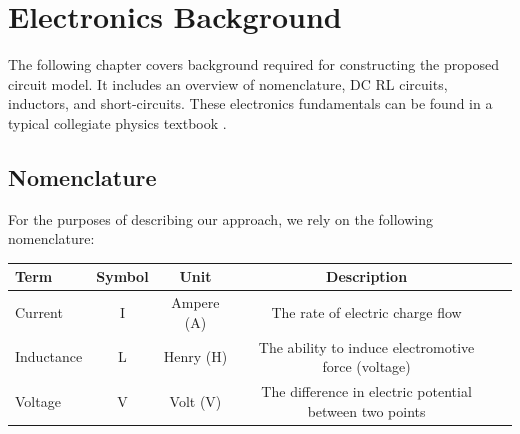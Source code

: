 \documentclass[11pt,oneside]{report}
\begin{document}
    \chapter{Electronics Background}\label{chap:electronics background}
    The following chapter covers background required for constructing the proposed circuit model. It includes an overview of nomenclature, DC RL circuits, inductors, and short-circuits. These electronics fundamentals can be found in a typical collegiate physics textbook \cite{uniphy}.
    
    \section{Nomenclature}
    For the purposes of describing our approach, we rely on the following nomenclature:
    
    \begin{center}
    \bgroup
    \def\arraystretch{1.0}%
    \begin{tabular}{| l | c | c | c | l |}
      \hline			
      Term & Symbol & Unit & Description\\  \hline \hline \cline{1-4}
      Current & I & Ampere (A) & The rate of electric charge flow \\ \cline{1-4}
      Inductance & L & Henry (H) & The ability to induce electromotive force (voltage)\\ \cline{1-4}
      Voltage & V & Volt (V) & The difference in electric potential between two points\\ \cline{1-4}
      \hline  
    \end{tabular}
    \egroup
    \end{center}
    
    
    
\end{document}
